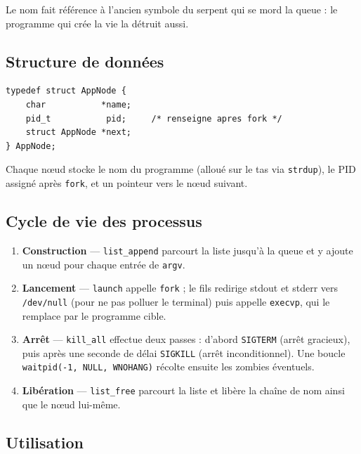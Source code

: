 \documentclass[12pt,a4paper]{article}
\begin{document}
Le nom fait référence à l'ancien symbole du serpent qui se mord la queue : le
programme qui crée la vie la détruit aussi.

\subsection{Structure de données}

\begin{lstlisting}[caption={Nœud de la liste chaînée \texttt{AppNode}}]
typedef struct AppNode {
    char           *name;
    pid_t           pid;     /* renseigne apres fork */
    struct AppNode *next;
} AppNode;
\end{lstlisting}

Chaque nœud stocke le nom du programme (alloué sur le tas via
\texttt{strdup}), le PID assigné après \texttt{fork}, et un pointeur vers le
nœud suivant.

\subsection{Cycle de vie des processus}

\begin{enumerate}
    \item \textbf{Construction} --- \texttt{list\_append} parcourt la liste
          jusqu'à la queue et y ajoute un nœud pour chaque entrée de
          \texttt{argv}.
    \item \textbf{Lancement} --- \texttt{launch} appelle \texttt{fork} ; le
          fils redirige stdout et stderr vers \texttt{/dev/null} (pour ne pas
          polluer le terminal) puis appelle \texttt{execvp}, qui le remplace
          par le programme cible.
    \item \textbf{Arrêt} --- \texttt{kill\_all} effectue deux passes :
          d'abord \texttt{SIGTERM} (arrêt gracieux), puis après une seconde
          de délai \texttt{SIGKILL} (arrêt inconditionnel). Une boucle
          \texttt{waitpid(-1, NULL, WNOHANG)} récolte ensuite les zombies
          éventuels.
    \item \textbf{Libération} --- \texttt{list\_free} parcourt la liste et
          libère la chaîne de nom ainsi que le nœud lui-même.
\end{enumerate}

\subsection{Utilisation}
\end{document}
